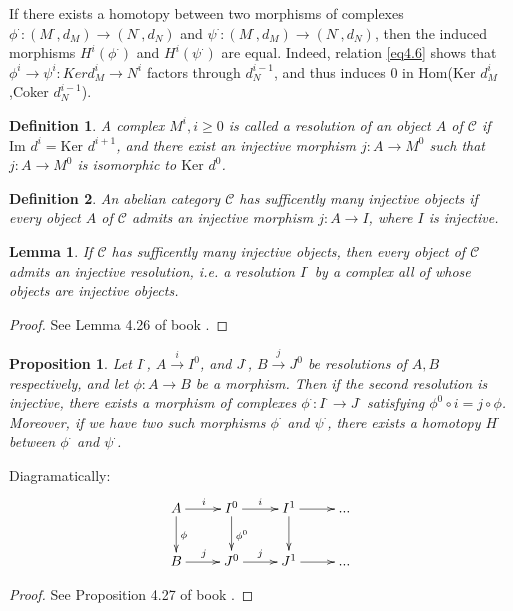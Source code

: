 \documentclass{article}
\numberwithin{equation}{subsection} %
\newtheorem{defi}{Definition}[section]
\newtheorem{lemma}{Lemma}[section]
\newtheorem{prop}{Proposition}[section]
\theoremstyle{definition}
\begin{document}
If there exists a homotopy between two morphisms of complexes $\phi^\cdot:(M^\cdot,d_M)\to(N^\cdot,d_N)$ and $\psi^\cdot:(M^\cdot,d_M)\to(N^\cdot,d_N)$, then the induced morphisms
$H^i(\phi^\cdot)$ and $H^i(\psi^\cdot)$ are equal. Indeed, relation \ref{eq4.6} shows that $\phi^i \to \psi^i : Ker d^i_M \to N^i$ factors through $d^{i-1}_N$, and thus induces 0 in Hom(Ker $d^i_M$,Coker $d^{i-1}_N$).

\begin{defi}
    A complex $M^i, i\geq 0$ is called a resolution of an object $A$ of 
    $\mathcal{C}$ if $\text{Im }d^i = \text{Ker }d^{i+1}$, and there exist an 
    injective morphism $j:A\to M^0$ such that $j:A\to M^0$ is isomorphic to
    $\text{Ker }d^0$.
\end{defi}

\begin{defi}
    An abelian category $\mathcal{C}$  has sufficently many injective objects
    if every object $A$ of $\mathcal{C}$  admits an injective morphism
    $j:A\to I$, where $I$ is injective.
\end{defi}

\begin{lemma}
    If $\mathcal{C}$ has sufficently many injective objects, then every
    object of $\mathcal{C}$ admits an injective resolution, i.e. a
    resolution $I^\cdot$ by a complex all of whose objects are injective
    objects.
\end{lemma}
\begin{proof}
	See Lemma 4.26 of book \cite{voisin}.
\end{proof}

\begin{prop}
	Let $I^\cdot$, $A\overset{i}{\to} I^0$, and $J^\cdot$, 
	$B\overset{j}{\to}J^0$ be resolutions of $A,B$ respectively,
	and let $\phi:A\to B$ be a morphism. Then if the second
	resolution is injective, there exists a morphism of complexes
	$\phi^\cdot : I^\cdot \to J^\cdot$ satisfying
	$\phi^0 \circ i=j\circ \phi$. Moreover, if we have two
	such morphisms $\phi^\cdot$ and $\psi^\cdot$, there exists
	a homotopy $H^\cdot$ between $\phi^\cdot$ and $\psi^\cdot$.
\end{prop}
Diagramatically:
$$ \xymatrix{
A \ar[r]^i\ar[d]^\phi	& I^0\ar[r]^i\ar[d]^{\phi^0} & I^1 \ar[r]\ar[d] &...\\
	B \ar[r]^j 	& J^0\ar[r]^j 	& J^1 \ar[r] &...\\
}$$
\begin{proof}
	See Proposition 4.27 of book \cite{voisin}.
\end{proof}
\end{document}
